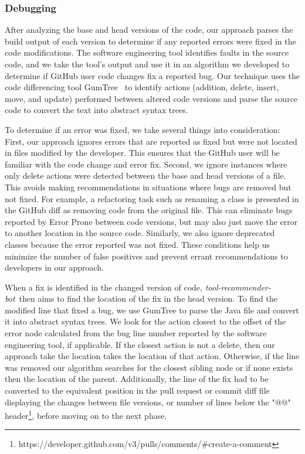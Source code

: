 \documentclass[sigconf,review,anonymous]{acmart}
\newcommand{\tool}{\textsl{tool-recommender-bot}}
\begin{document}
\subsubsection{Debugging}

After analyzing the base and head versions of the code, our approach parses the build output of each version to determine if any reported errors were fixed in the code modifications. The software engineering tool identifies faults in the source code, and we take the tool's output and use it in an algorithm we developed to determine if GitHub user code changes fix a reported bug. Our technique uses the code differencing tool GumTree~\cite{GumTree} to identify actions (addition, delete, insert, move, and update) performed between altered code versions and parse the source code to convert the text into abstract syntax trees. 

To determine if an error was fixed, we take several things into consideration: First, our approach ignores errors that are reported as fixed but were not located in files modified by the developer. This ensures that the GitHub user will be familiar with the code change and error fix. Second, we ignore instances where only delete actions were detected between the base and head versions of a file. This avoids making recommendations in situations where bugs are removed but not fixed. For example, a refactoring task such as renaming a class is presented in the GitHub diff as removing code from the original file. This can eliminate bugs reported by Error Prone between code versions, but may also just move the error to another location in the source code. Similarly, we also ignore deprecated classes because the error reported was not fixed. These conditions help us minimize the number of false positives and prevent errant recommendations to developers in our approach.

When a fix is identified in the changed version of code, \tool~then aims to find the location of the fix in the head version. To find the modified line that fixed a bug, we use GumTree to parse the Java file and convert it into abstract syntax trees. We look for the action closest to the offset of the error node calculated from the bug line number reported by the software engineering tool, if applicable. If the closest action is not a delete, then our approach take the location takes the location of that action. Otherwise, if the line was removed our algorithm searches for the closest sibling node or if none exists then the location of the parent. Additionally, the line of the fix had to be converted to the equivalent position in the pull request or commit diff file displaying the changes between file versions, or number of lines below the "@@" header\footnote{https://developer.github.com/v3/pulls/comments/\#create-a-comment}, before moving on to the next phase.
\end{document}
